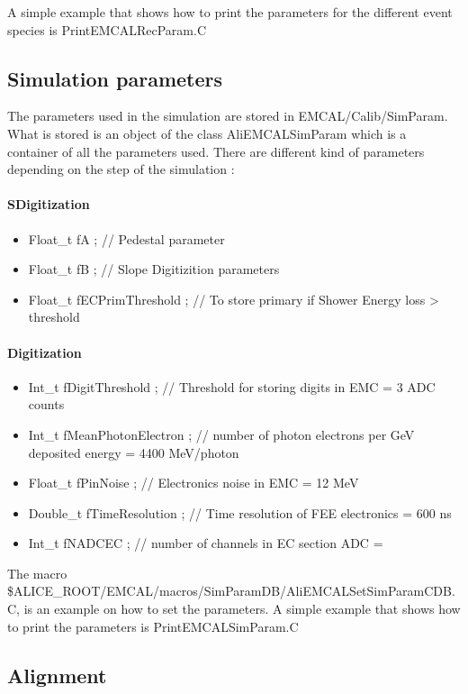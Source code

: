 A simple example that shows how to print the parameters for the different event species is PrintEMCALRecParam.C 


\subsection{Simulation parameters}


The parameters used in the simulation are stored in EMCAL/Calib/SimParam. What is stored is an object of the class AliEMCALSimParam which is a container of all the parameters used. There are different kind of parameters depending on the step of the simulation :

\paragraph*{SDigitization}
\begin{itemize}
        \item Float\_t fA ;                      // Pedestal parameter

        \item Float\_t fB ;                      // Slope Digitizition parameters

        \item Float\_t fECPrimThreshold ; // To store primary if Shower Energy loss > threshold
\end{itemize} 

\paragraph*{Digitization}
\begin{itemize}
       \item  Int\_t   fDigitThreshold  ;        // Threshold for storing digits in EMC = 3 ADC counts

        \item Int\_t   fMeanPhotonElectron ; // number of photon electrons per GeV deposited energy = 4400 MeV/photon 

         \item Float\_t fPinNoise ;                // Electronics noise in EMC = 12 MeV

         \item Double\_t fTimeResolution ;    // Time resolution of FEE electronics = 600 ns

         \item Int\_t   fNADCEC ;                 // number of channels in EC section ADC = 
\end{itemize}
 

The macro \$ALICE\_ROOT/EMCAL/macros/SimParamDB/AliEMCALSetSimParamCDB.C, is an example on how to set the parameters. A simple example that shows how to print the parameters is PrintEMCALSimParam.C 

\subsection{Alignment}

